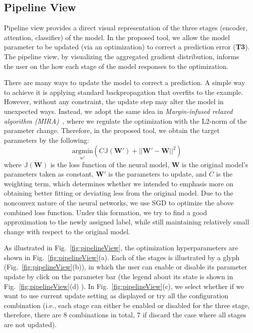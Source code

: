 \subsection{Pipeline View}
\label{sec:pipeline}
Pipeline view provides a direct visual representation of the three stages (encoder, attention, classifier) of the model. In the proposed tool, we allow the model parameter to be updated (via an optimization) to correct a prediction error (\textbf{T3}). The pipeline view, by visualizing the aggregated gradient distribution, informs the user on the how each stage of the model responses to the optimization.

There are many ways to update the model to correct a prediction. A simple way to achieve it is applying standard backpropagation that overfits to the example. However, without any constraint, the update step may alter the model in unexpected ways.
Instead, we adopt the same idea in \emph{Margin-infused relaxed algorithm (MIRA)}~\cite{CrammerSinger2003}, where we regulate the optimization with the L2-norm of the parameter change. Therefore, in the proposed tool, we obtain the target parameters by the following:
\begin{equation}
\underset{w'}{\mathrm{argmin}}( C \mathbb{J}(\mathbf{W}') + ||\mathbf{W}' - \mathbf{W}||^2)
\end{equation}
where $\mathbb{J}(\mathbf{W})$ is the loss function of the neural model, $\mathbf{W}$ is the original model's parameters taken as constant, $\mathbf{W}'$ is the parameters to update, and $C$ is the weighting term, which determines whether we intended to emphasis more on obtaining better fitting or deviating less from the original model. Due to the nonconvex nature of the neural networks, we use SGD to optimize the above combined loss function.
%
Under this formation, we try to find a good approximation to the newly assigned label, while still maintaining relatively small change with respect to the original model.

As illustrated in Fig.~\ref{fig:pipelineView},
the optimization hyperparameters are shown in Fig.~\ref{fig:pipelineView}(a). Each of the stages is illustrated by a glyph (Fig.~\ref{fig:pipelineView}(b)), in which the user can enable or disable its parameter update by click on the parameter bar (the legend about its state is shown in Fig.~\ref{fig:pipelineView}(d) ). In Fig.~\ref{fig:pipelineView}(c), we select whether if we want to use current update setting as displayed or try all the configuration combination (i.e., each stage can either be enabled or disabled for the three stage, therefore, there are $8$ combinations in total, $7$ if discard the case where all stages are not updated).

